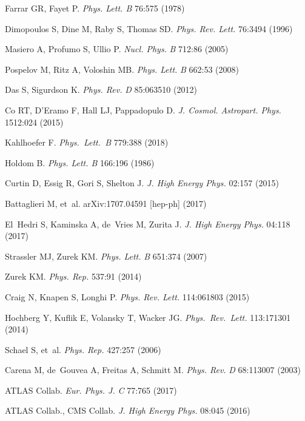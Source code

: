 \documentclass{ar-1col}
\begin{document}
\begin{thebibliography}{175}
Farrar GR, Fayet P. \textit{Phys. Lett. B} 76:575 (1978)

Dimopoulos S, Dine M, Raby S, Thomas SD. \textit{Phys. Rev. Lett.}
76:3494 (1996)

Masiero A, Profumo S, Ullio P. \textit{Nucl. Phys.} \textit{B} 712:86 (2005)

Pospelov M, Ritz A, Voloshin MB. \textit{Phys. Lett.} \textit{B} 662:53
(2008)
  
Das S, Sigurdson K. \textit{Phys. Rev.} \textit{D} 85:063510 (2012)

Co RT, D'Eramo F, Hall LJ, Pappadopulo D. \textit{J. Cosmol. Astropart. Phys.} 1512:024
(2015)

  Kahlhoefer F. \textit{Phys.\ Lett.\ B }{779}:388 (2018)

Holdom B. \textit{Phys. Lett. B} 166:196 (1986)

Curtin D, Essig R, Gori S, Shelton J. \textit{J. High Energy Phys.} 02:157 (2015)

Battaglieri M, et~al. arXiv:1707.04591 [hep-ph] (2017)

El~Hedri S, Kaminska A, de~Vries M, Zurita J. \textit{J. High Energy Phys.} 04:118
(2017)

Strassler MJ, Zurek KM. \textit{Phys. Lett.} \textit{B} 651:374 (2007)

Zurek KM. \textit{Phys. Rep.} 537:91 (2014)

Craig N, Knapen S, Longhi P. \textit{Phys. Rev. Lett.} 114:061803
(2015)

  Hochberg Y, Kuflik E, Volansky T, Wacker JG.  \textit{Phys.\ Rev.\ Lett.}  {113}:171301 (2014)
  

Schael S, et~al. \textit{Phys. Rep.} 427:257 (2006)

Carena M, de~Gouvea A, Freitas A, Schmitt M. \textit{Phys. Rev.}
\textit{D} 68:113007 (2003)

{ATLAS Collab.} \textit{Eur. Phys. J.} \textit{C} 77:765 (2017)


{ATLAS Collab., CMS Collab}. \textit{J. High Energy Phys.} 08:045 (2016)


\end{thebibliography}
\end{document}

